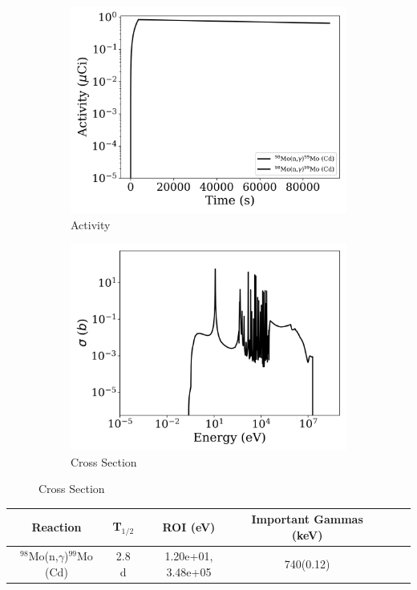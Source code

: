 \begin{figure}[h]
\centering
\begin{subfigure}{.5\textwidth}
  \centering
     \includegraphics[width=.8\textwidth]{plot/Mo-98(n,gamma)Mo-99_Cd_wisconsin1} 

  \caption{Activity}
\end{subfigure}%
\begin{subfigure}{.5\textwidth}
  \centering
     \includegraphics[width=.8\textwidth]{plot/Mo-98(n,gamma)Mo-99_Cd} 

  \caption{Cross Section}
\end{subfigure}
\end{figure}

\begin{table}[h]
\centering
\begin{tabular}{ |c|c|c|c|c|c|c| }
 \hline
 Reaction & T$_{1/2}$ & ROI (eV) & Important Gammas (keV) \\
 \hline 
 $^{98}$Mo(n,$\gamma$)$^{99}$Mo (Cd) &  2.8 d & 1.20e+01, 3.48e+05 & 740(0.12) \\ 
\hline
\end{tabular}
\end{table}
